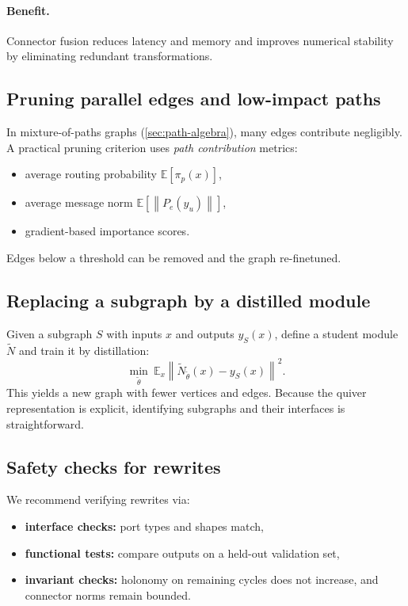 \documentclass[11pt]{article}
\theoremstyle{definition}
\theoremstyle{plain}
\theoremstyle{remark}
\newcommand{\E}{\mathbb{E}}
\newcommand{\norm}[1]{\left\lVert #1 \right\rVert}
\begin{document}
\paragraph{Benefit.}
Connector fusion reduces latency and memory and improves numerical stability by eliminating redundant transformations.

\subsection{Pruning parallel edges and low-impact paths}
In mixture-of-paths graphs (\cref{sec:path-algebra}), many edges contribute negligibly.
A practical pruning criterion uses \emph{path contribution} metrics:
\begin{itemize}[leftmargin=2em]
\item average routing probability $\E[\pi_p(x)]$,
\item average message norm $\E[\norm{P_e(y_u)}]$,
\item gradient-based importance scores.
\end{itemize}
Edges below a threshold can be removed and the graph re-finetuned.

\subsection{Replacing a subgraph by a distilled module}
Given a subgraph $S$ with inputs $x$ and outputs $y_S(x)$, define a student module $\tilde N$ and train it by distillation:
\[
\min_{\tilde\theta}\ \E_x \norm{\tilde N_{\tilde\theta}(x)-y_S(x)}^2.
\]
This yields a new graph with fewer vertices and edges.
Because the quiver representation is explicit, identifying subgraphs and their interfaces is straightforward.

\subsection{Safety checks for rewrites}
We recommend verifying rewrites via:
\begin{itemize}[leftmargin=2em]
\item \textbf{interface checks:} port types and shapes match,
\item \textbf{functional tests:} compare outputs on a held-out validation set,
\item \textbf{invariant checks:} holonomy on remaining cycles does not increase, and connector norms remain bounded.
\end{itemize}
\end{document}
